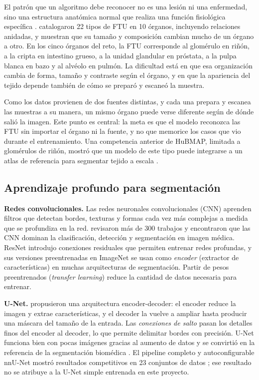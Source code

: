 \documentclass[11pt,letterpaper]{article}
\begin{document}
El patrón que un algoritmo debe reconocer no es una lesión ni una enfermedad, sino una estructura
anatómica normal que realiza una función fisiológica específica \parencite{jain2023hacking}.
\textcite{bidanta2025ftu} catalogaron 22 tipos de FTU en 10 órganos, incluyendo relaciones anidadas, y
muestran que su tamaño y composición cambian mucho de un órgano a otro. En los cinco órganos del reto,
la FTU corresponde al glomérulo en riñón, a la cripta en intestino grueso, a la unidad glandular en
próstata, a la pulpa blanca en bazo y al alvéolo en pulmón. La dificultad está en que esa
organización cambia de forma, tamaño y contraste según el órgano, y en que la apariencia del tejido
depende también de cómo se preparó y escaneó la muestra.

Como los datos provienen de dos fuentes distintas, y cada una prepara y escanea las muestras a su
manera, un mismo órgano puede verse diferente según de dónde salió la imagen. Este punto es central:
la meta es que el modelo reconozca las FTU sin importar el órgano ni la fuente, y no que memorice
los casos que vio durante el entrenamiento. Una competencia anterior de HuBMAP, limitada a
glomérulos de riñón, mostró que un modelo de este tipo puede integrarse a un atlas de referencia para
segmentar tejido a escala \parencite{jain2023kidney}.

\subsection{Aprendizaje profundo para segmentación}

\textbf{Redes convolucionales.} Las redes neuronales convolucionales (CNN) aprenden filtros que
detectan bordes, texturas y formas cada vez más complejas a medida que se profundiza en la red.
\textcite{litjens2017survey} revisaron más de 300 trabajos y encontraron que las CNN dominan la
clasificación, detección y segmentación en imagen médica. ResNet \parencite{he2016resnet} introdujo
conexiones residuales que permiten entrenar redes profundas, y sus versiones preentrenadas en
ImageNet se usan como \emph{encoder} (extractor de características) en muchas arquitecturas de
segmentación. Partir de pesos preentrenados (\emph{transfer learning}) reduce la cantidad de datos
necesaria para entrenar.

\textbf{U-Net.} \textcite{ronneberger2015unet} propusieron una arquitectura encoder-decoder: el
encoder reduce la imagen y extrae características, y el decoder la vuelve a ampliar hasta producir
una máscara del tamaño de la entrada. Las \emph{conexiones de salto} pasan los detalles finos del
encoder al decoder, lo que permite delimitar bordes con precisión. U-Net funciona bien con pocas
imágenes gracias al aumento de datos y se convirtió en la referencia de la segmentación biomédica
\parencite{siddique2021unet}. El pipeline completo y autoconfigurable nnU-Net mostró resultados
competitivos en 23 conjuntos de datos \parencite{isensee2021nnunet}; ese resultado no se atribuye
a la U-Net simple entrenada en este proyecto.
\end{document}
